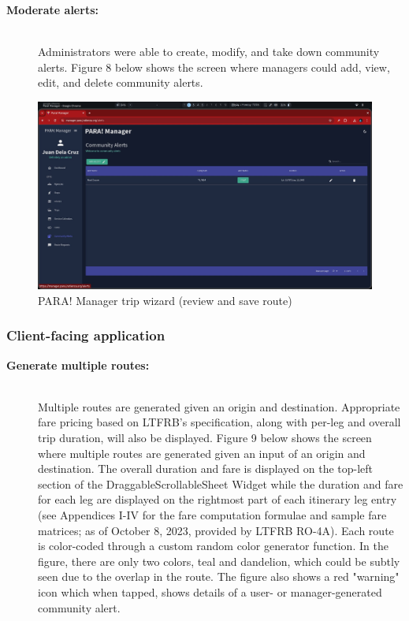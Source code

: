 \documentclass{icsthesis}
\begin{document}
\begin{mainmatter}
\begin{description}
			\item[\textbf{Moderate alerts:}] \hfill \\
			   Administrators were able to create, modify, and take down community alerts.
			   Figure 8 below shows the screen where managers could add, view, edit, and delete community alerts.
		\end{description}
		
		\begin{figure}[!h]
			\centering
				\includegraphics[scale=0.15]{./figures/manager/alerts.jpeg}
			\caption{PARA! Manager trip wizard (review and save route)}
		\end{figure}
		
		\newpage
		
		\subsubsection{\textbf{Client-facing application}}
		
		\begin{description}
		
			\item[\textbf{Generate multiple routes:}] \hfill \\
				Multiple routes are generated given an origin and destination. Appropriate fare pricing based on LTFRB's specification, along with per-leg and overall trip duration, will also be displayed.
		Figure 9 below shows the screen where multiple routes are generated given an input of an origin and destination.
        The overall duration and fare is displayed on the top-left section of the DraggableScrollableSheet Widget while the duration and fare for each leg are displayed on the rightmost part of each itinerary leg entry (see Appendices I-IV for the fare computation formulae and sample fare matrices; as of October 8, 2023, provided by LTFRB RO-4A).
		Each route is color-coded through a custom random color generator function. In the figure, there are only two colors, teal and dandelion, which could be subtly seen due to the overlap in the route.
		The figure also shows a red "warning" icon which when tapped, shows details of a user- or manager-generated community alert.
		

\end{description}
\end{mainmatter}
\end{document}
